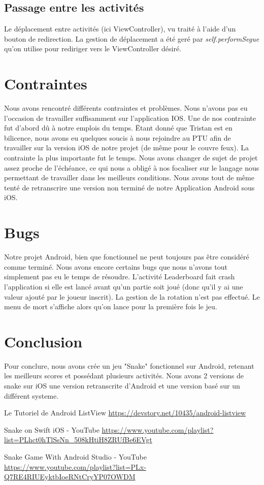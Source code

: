 \documentclass{article}
\begin{document}
\subsection{Passage entre les activités}
Le déplacement entre activités (ici ViewController), vu traité à l'aide d'un bouton de redirection. La gestion de déplacement a été geré par \textit{self.performSegue} qu'on utilise pour rediriger vers le ViewController désiré.


\section{Contraintes}
Nous avons rencontré différents contraintes et problèmes. Nous n'avons pas eu l'occasion de travailler suffisamment sur l'application IOS. Une de nos contrainte fut d'abord dû à notre emplois du temps. \"Etant donné que Tristan est en bilicence, nous avons eu quelques soucis à nous rejoindre au PTU afin de travailler sur la version iOS de notre projet (de même pour le couvre feux). La contrainte la plus importante fut le temps. Nous avons changer de sujet de projet assez proche de l'échéance, ce qui nous a obligé à nos focaliser sur le langage nous permettant de travailler dans les meilleurs conditions. Nous avons tout de même tenté de retranscrire une version non terminé de notre Application Android sous iOS.

\section{Bugs}
Notre projet Android, bien que fonctionnel ne peut toujours pas être considéré comme terminé. Nous avons encore certains bugs que nous n'avons tout simplement pas eu le temps de résoudre. L'activité Leaderboard fait crash l'application si elle est lancé avant qu'un partie soit joué (donc qu'il y ai une valeur ajouté par le joueur inscrit). La gestion de la rotation n'est pas effectué. Le menu de mort s'affiche alors qu'on lance pour la première fois le jeu.
\section{Conclusion}
Pour conclure, nous avons crée un jeu "Snake" fonctionnel sur Android, retenant les meilleurs scores et possédant plusieurs activités. Nous avons 2 versions de snake sur iOS une version retranscrite d'Android et une version basé sur un différent systeme.

\begin{thebibliography}{9}
    \label{list}
    Le Tutoriel de Android ListView
    \url{https://devstory.net/10435/android-listview}
    
    \label{ios}
    Snake on Swift iOS - YouTube
    \url{https://www.youtube.com/playlist?list=PLhct0hTlSsNn_508kHtiH8ZRUfBe6EVgt}
    
    \label{and}
    Snake Game With Android Studio - YouTube
    \url{https://www.youtube.com/playlist?list=PLx-Q7RE4RIUEyktbIoeRNtCryYP07OWDM}
\end{thebibliography}
\end{document}
